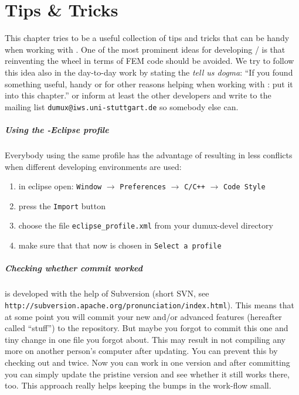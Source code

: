 \chapter{Tips \& Tricks}

This chapter tries to be a useful collection of tips and tricks that can be handy when working with 
\Dumux. One of the most prominent ideas for developing \Dune / \Dumux is that reinventing the wheel in terms of FEM code should
be avoided.  We try to follow this idea also in the day-to-day work by stating the \emph{tell us dogma}: ``If you found something useful, 
handy or for other reasons helping when working with \Dumux: put it into this chapter.'' or inform at least the other developers and write 
to the mailing list \texttt{dumux@iws.uni-stuttgart.de} so somebody else can.

\paragraph{Using the \Dumux-Eclipse profile}

Everybody using the same profile has the advantage of resulting in less conflicts when different developing environments are used:
\begin{enumerate}
  \item in eclipse open: \texttt{Window} $\rightarrow$ \texttt{Preferences} $\rightarrow$ \texttt{C/C++}  $\rightarrow$ \texttt{Code Style}
  \item press the \texttt{Import} button
  \item choose the file \texttt{eclipse\_profile.xml} from your dumux-devel directory
  \item make sure that that now \Dumux is chosen in \texttt{Select a profile}
\end{enumerate}

\paragraph{Checking whether commit worked}

\Dumux is developed with the help of Subversion (short SVN, see \texttt{http://subversion.apache.org/pronunciation/index.html}). This means that at some point you will commit your new 
and/or advanced features (hereafter called ``stuff'') to the repository. But maybe you forgot to commit this one and tiny change in one file you forgot about. 
This may result in \Dumux not compiling any more on another person's computer after updating. You can prevent this by checking out \Dune and \Dumux twice. Now you can work in one version and after committing you can simply update the pristine version and see whether it still works there, too. 
This approach really helps keeping the bumps in the work-flow small.

